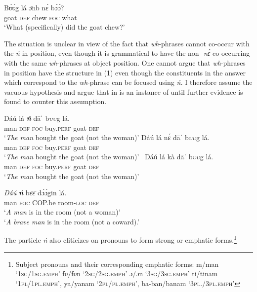 \documentclass[output=paper,modfonts,nonflat,
 hidelinks
]{langsci/langscibook}
\begin{document}
{    \ea
    \gll B\'{ʋ}\'{ʋ}g  lá   \={ɔ}nb  n\'{ɛ}   b\'{ɔ}\'{ɔ}?    \\
    goat  \textsc{def}  chew  \textsc{foc}  what    \\
    \glt ‘What (specifically) did the goat chew?’      
    \z  
     
    The situation is unclear in view of the fact that \textit{wh}{}-phrases cannot co-occur with the  \textit{ń} in  position, even though it is grammatical to have the non-  \textit{nɛ́} co-occurring with the same \textit{wh}{}-phrases at object position. One cannot argue that \textit{wh}{}-phrases in  position have the structure in (1) even though the constituents in the answer which correspond to the \textit{wh}{}-phrase can be focused using \textit{ń.} I therefore assume the vacuous  hypothesis and argue that   in  is an instance of  until further evidence is found to counter this assumption.
 }  

 
 
\ea\label{ex:abubakari:13}
\ea\label{ex:abubakari:13a}  
\gll Dáú    lá \textbf{\textit{ń}} dāˈ    b$\upsilon \upsilon $g  lá.\\
man  \textsc{def}  \textsc{foc}  buy.\textsc{perf}  goat  \textsc{def}\\
\glt ‘\textit{The man} bought the goat (not the woman)’
\ex\label{ex:abubakari:13b}
\gll *Dáú  lá  nɛ́  dāˈ    b$\upsilon \upsilon $g  lá.\\
man  \textsc{def}  \textsc{foc}  buy.\textsc{perf}  goat  \textsc{def} \\
\glt ‘\textit{The man} bought the goat (not the woman)’
\ex\label{ex:abubakari:13c}\
\gll *Dáú  lá  kà  dāˈ    b$\upsilon \upsilon $g  lá.\\
man  \textsc{def}  \textsc{foc}  buy.\textsc{perf}  goat  \textsc{def}\\
\glt ‘\textit{The man} bought the goat (not the woman)’
\z 
\z
 
\ea\label{ex:abubakari:14} 
\gll \textit{Dáú} \textbf{\textit{ń}} bɛ̄ɛ̄    dɔ́ɔ́gin    lá.\\
man  \textsc{foc}  COP.be    room-\textsc{loc}  \textsc{def}\\
\glt ‘\textit{A man} is in the room (not a woman)’\\
\glt ‘\textit{A brave man} is in the room (not a coward).’
\z 

The particle \textit{ń} also cliticizes on  pronouns to form strong or emphatic forms.\footnote{Subject pronouns and their corresponding emphatic forms: m/man ‘1\textsc{sg}/1\textsc{sg}.\textsc{emph}’ fʋ/fʋn ‘2\textsc{sg}/2\textsc{sg}.\textsc{emph}’ ɔ/ɔn ‘3\textsc{sg}/3\textsc{sg}.\textsc{emph}’ ti/tinam ‘1\textsc{pl}/1\textsc{pl}.\textsc{emph}’, ya/yanam ‘2\textsc{pl}/\textsc{pl}.\textsc{emph}’, ba-ban/banam ‘3\textsc{pl}./3\textsc{pl}.\textsc{emph}’}
\end{document}
